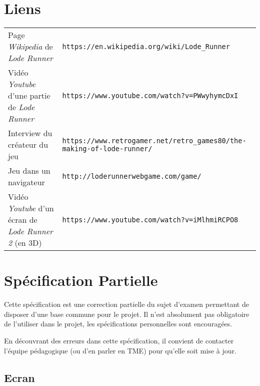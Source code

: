 \documentclass{article}
\begin{document}
\authors{}

\entete{}

\section*{Liens}

{\small
  \begin{tabular}{ll}

Page \emph{Wikipedia} de \emph{Lode Runner} & \texttt{https://en.wikipedia.org/wiki/Lode\_Runner} \\
Vidéo \emph{Youtube} d'une partie de \emph{Lode Runner} & \texttt{https://www.youtube.com/watch?v=PWwyhymcDxI} \\
Interview du créateur du jeu & \texttt{https://www.retrogamer.net/retro\_games80/the-making-of-lode-runner/} \\
Jeu dans un navigateur & \texttt{http://loderunnerwebgame.com/game/} \\
Vidéo \emph{Youtube} d'un écran de \emph{Lode Runner 2} (en 3D)& 
  \texttt{https://www.youtube.com/watch?v=iMlhmiRCPO8}
\end{tabular}}

\section*{Spécification Partielle}

Cette spécification est une correction partielle du sujet d'examen
permettant de disposer d'une base commune pour le projet. Il n'est
absolument pas obligatoire de l'utiliser dans le projet, les
spécifications personnelles sont encouragées.

En découvrant des erreurs dans cette spécification, il convient de
contacter l'équipe pédagogique (ou d'en parler en TME) pour qu'elle
soit mise à jour.

\subsection*{Ecran}
\end{document}
